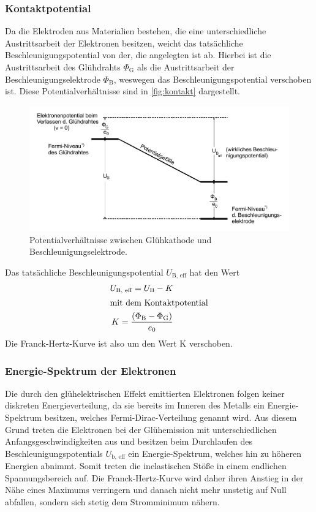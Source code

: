 \subsubsection{Kontaktpotential}

Da die Elektroden aus Materialien bestehen, die eine unterschiedliche Austrittsarbeit der Elektronen besitzen,
weicht das tatsächliche Beschleunigungspotential von der, die angelegten ist ab.
Hierbei ist die Austrittsarbeit des Glühdrahts $\Phi_\text{G}$ als die Austrittsarbeit der Beschleunigungselektrode $\Phi_\text{B}$,
weswegen das Beschleunigungspotential verschoben ist. Diese Potentialverhältnisse sind in \autoref{fig:kontakt} dargestellt.
\begin{figure}
    \centering
    \includegraphics[width=0.8\linewidth]{pictures/kontakt.pdf}
    \caption{Potentialverhältnisse zwischen Glühkathode und Beschleunigungselektrode. \cite{v601}}
    \label{fig:kontakt}
\end{figure}
Das tatsächliche Beschleunigungspotential $U_\text{B, eff}$ hat den Wert
\begin{align}
    U_\text{B, eff} = U_\text{B} - K \\
    \intertext{mit dem Kontaktpotential}
    K = \frac{\left( \Phi_\text{B} - \Phi_\text{G} \right)}{e_0} \label{eq:Kontaktpotential}
\end{align}
Die Franck-Hertz-Kurve ist also um den Wert K verschoben.


\subsubsection{Energie-Spektrum der Elektronen}

Die durch den glühelektrischen Effekt emittierten Elektronen folgen keiner diskreten Energieverteilung,
da sie bereits im Inneren des Metalls ein Energie-Spektrum besitzen, welches Fermi-Dirac-Verteilung genannt wird.
Aus diesem Grund treten die Elektronen bei der Glühemission mit unterschiedlichen Anfangsgeschwindigkeiten aus
und besitzen beim Durchlaufen des Beschleunigungspotentials $U_\text{b, eff}$ ein Energie-Spektrum,
welches hin zu höheren Energien abnimmt.
Somit treten die inelastischen Stöße in einem endlichen Spannungsbereich auf.
Die Franck-Hertz-Kurve wird daher ihren Anstieg in der Nähe eines Maximums verringern 
und danach nicht mehr unstetig auf Null abfallen, sondern sich stetig dem Stromminimum nähern.


